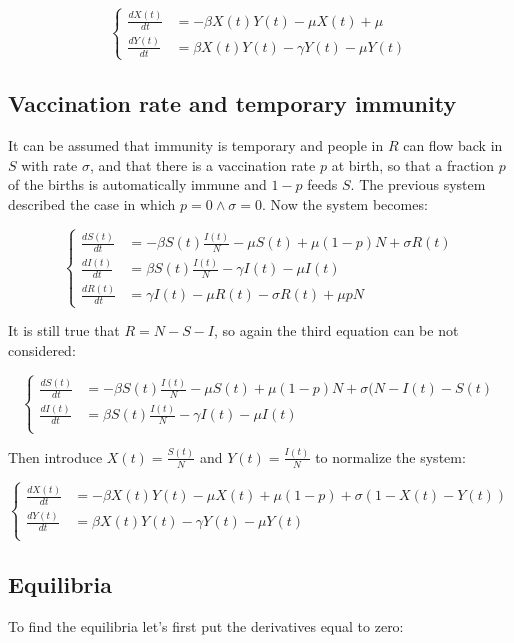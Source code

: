   $$\begin{cases}
    \frac{dX(t)}{dt} &= -\beta X(t)Y(t) - \mu X(t) + \mu\\
    \frac{dY(t)}{dt} &= \beta X(t)Y(t) - \gamma Y(t) - \mu Y(t)
  \end{cases}$$

  \subsection{Vaccination rate and temporary immunity}
  It can be assumed that immunity is temporary and people in $R$ can flow back in $S$ with rate $\sigma$, and that there is a vaccination rate $p$ at birth, so that a fraction $p$ of the births is automatically immune and $1-p$ feeds $S$.
  The previous system described the case in which $p=0\land\sigma=0$.
  Now the system becomes:

  $$\begin{cases}
    \frac{dS(t)}{dt} &= -\beta S(t)\frac{I(t)}{N} - \mu S(t) + \mu (1-p)N + \sigma R(t)\\
    \frac{dI(t)}{dt} &= \beta S(t)\frac{I(t)}{N} - \gamma I(t) - \mu I(t)\\
    \frac{dR(t)}{dt} &= \gamma I(t) - \mu R(t) - \sigma R(t) + \mu p N
  \end{cases}$$

  It is still true that $R = N-S-I$, so again the third equation can be not considered:

  $$\begin{cases}
    \frac{dS(t)}{dt} &= -\beta S(t)\frac{I(t)}{N} - \mu S(t) + \mu (1-p)N + \sigma (N - I(t) - S(t)\\
    \frac{dI(t)}{dt} &= \beta S(t)\frac{I(t)}{N} - \gamma I(t) - \mu I(t)\\
  \end{cases}$$

  Then introduce $X(t) = \frac{S(t)}{N}$ and $Y(t) = \frac{I(t)}{N}$ to normalize the system:

  $$\begin{cases}
    \frac{dX(t)}{dt} &= -\beta X(t)Y(t) - \mu X(t) + \mu (1-p) + \sigma (1 - X(t) - Y(t))\\
    \frac{dY(t)}{dt} &= \beta X(t)Y(t) - \gamma Y(t) - \mu Y(t)\\
  \end{cases}$$

  \subsection{Equilibria}
  To find the equilibria let's first put the derivatives equal to zero:

